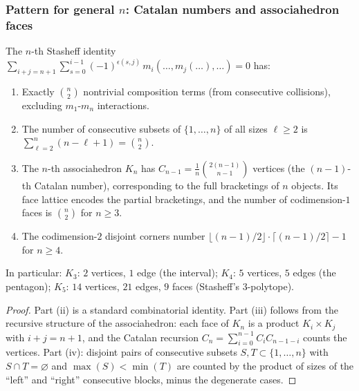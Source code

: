 \subsubsection{Pattern for general $n$: Catalan numbers and
associahedron faces}

\begin{proposition}
The $n$-th Stasheff identity
$\sum_{i+j=n+1} \sum_{s=0}^{i-1}
(-1)^{\epsilon(s,j)}\, m_i(\ldots, m_j(\ldots), \ldots) = 0$
has:
\begin{enumerate}[label=\textup{(\roman*)}]
\item Exactly $\binom{n}{2}$ nontrivial composition terms
 (from consecutive collisions), excluding $m_1$-$m_n$
 interactions.
\item The number of consecutive subsets of $\{1,\ldots,n\}$
 of all sizes $\ell \ge 2$ is
 $\sum_{\ell=2}^{n} (n-\ell+1) = \binom{n}{2}$.
\item The $n$-th associahedron $K_n$ has
 $C_{n-1} = \frac{1}{n}\binom{2(n-1)}{n-1}$ vertices
 (the $(n{-}1)$-th Catalan number), corresponding to
 the full bracketings of $n$ objects. Its face lattice
 encodes the partial bracketings, and the number of
 codimension-$1$ faces is
 $\binom{n}{2}$ for $n \ge 3$.
\item The codimension-$2$ disjoint corners number
 $\lfloor (n-1)/2 \rfloor \cdot
 \lceil (n-1)/2 \rceil - 1$ for $n \ge 4$.
\end{enumerate}
In particular:
$K_3$: $2$ vertices, $1$ edge (the interval);
$K_4$: $5$ vertices, $5$ edges (the pentagon);
$K_5$: $14$ vertices, $21$ edges, $9$ faces (Stasheff's
$3$-polytope).
\end{proposition}

\begin{proof}
Part (ii) is a standard combinatorial identity. Part (iii)
follows from the recursive structure of the associahedron:
each face of $K_n$ is a product $K_i \times K_j$ with
$i + j = n + 1$, and the Catalan recursion
$C_n = \sum_{i=0}^{n-1} C_i C_{n-1-i}$ counts the
vertices. Part (iv): disjoint pairs of consecutive
subsets $S, T \subset \{1,\ldots,n\}$ with $S \cap T =
\varnothing$ and $\max(S) < \min(T)$ are counted by
the product of sizes of the ``left'' and ``right''
consecutive blocks, minus the degenerate cases.
\end{proof}



